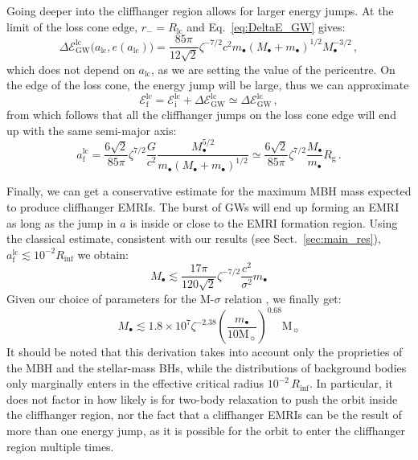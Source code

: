 \documentclass[desactivate]{aa}
\begin{document}
        Going deeper into the cliffhanger region allows for larger energy jumps. At the limit of the loss cone edge, $r_- = R_\mathrm{lc}$ and Eq.\ \eqref{eq:DeltaE_GW} gives:
        \begin{equation}
            \Delta \mathcal{E}_\mathrm{GW}^\mathrm{lc} \big(a_\mathrm{lc},e(a_\mathrm{lc})\big) = \frac{85 \pi}{12 \sqrt{2}} \zeta^{-7/2} c^2 m_\bullet (M_\bullet + m_\bullet)^{1/2} M_\bullet^{-3/2} \, ,
        \end{equation}
        which does not depend on $a_\mathrm{lc}$, as we are setting the value of the pericentre. On the edge of the loss cone, the energy jump will be large, thus we can approximate
        \begin{equation} \label{eq:energy_approx}
            \mathcal{E}_\mathrm{f}^\mathrm{lc} = \mathcal{E}_\mathrm{i}^\mathrm{lc} + \Delta \mathcal{E}_\mathrm{GW}^\mathrm{lc} \simeq \Delta \mathcal{E}_\mathrm{GW}^\mathrm{lc} \, ,
        \end{equation}
        from which follows that all the cliffhanger jumps on the loss cone edge will end up with the same semi-major axis:
        \begin{equation} \label{eq:a_lc_final}
            a_\mathrm{f}^\mathrm{lc} = \frac{6\sqrt{2}}{85 \pi} \zeta^{7/2} \frac{G}{c^2} \frac{M_\bullet^{5/2}}{m_\bullet(M_\bullet+m_\bullet)^{1/2}} \simeq \frac{6\sqrt{2}}{85 \pi} \zeta^{7/2} \frac{M_\bullet}{m_\bullet} R_\mathrm{g} \, .
        \end{equation}

        Finally, we can get a conservative estimate for the maximum MBH mass expected to produce cliffhanger EMRIs. The burst of GWs will end up forming an EMRI as long as the jump in $a$ is inside or close to the EMRI formation region. Using the classical estimate, consistent with our results (see Sect.\ \ref{sec:main_res}), $a_\mathrm{f}^\mathrm{lc} \lesssim 10^{-2} R_\mathrm{inf}$ we obtain:
        \begin{equation}
            M_\bullet \lesssim \frac{17 \pi}{120 \sqrt{2}} \zeta^{-7/2} \frac{c^2}{\sigma^2}  m_\bullet 
        \end{equation}
        Given our choice of parameters for the M-$\sigma$ relation \citep{2009ApJ...698..198G}, we finally get:
        \begin{equation} \label{eq:M_max}
            M_\bullet \lesssim 1.8 \times 10^7 \zeta^{-2.38} \left( \frac{m_\bullet}{10 \mathrm{M}_\sun} \right)^{0.68} \mathrm{M}_\sun
        \end{equation}
        It should be noted that this derivation takes into account only the proprieties of the MBH and the stellar-mass BHs, while the distributions of background bodies only marginally enters in the effective critical radius $10^{-2} \, R_\mathrm{inf}$. In particular, it does not factor in how likely is for two-body relaxation to push the orbit inside the cliffhanger region, nor the fact that a cliffhanger EMRIs can be the result of more than one energy jump, as it is possible for the orbit to enter the cliffhanger region multiple times.
        
\end{document}
